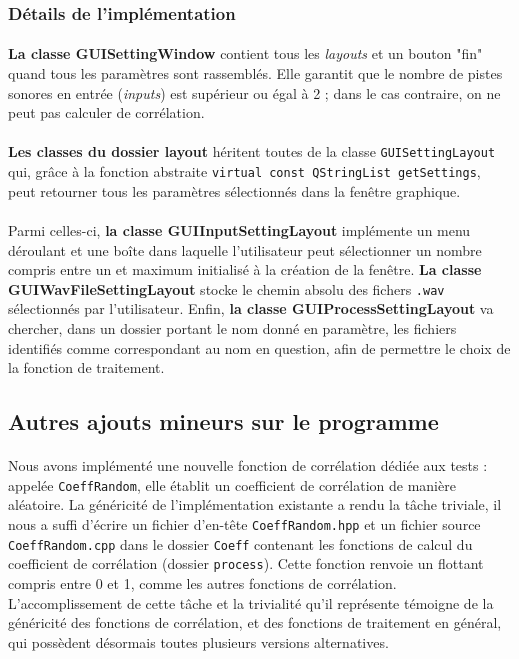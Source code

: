  \subsubsection{Détails de l'implémentation}
 \paragraph{}
 \textbf{La classe GUISettingWindow} contient tous les
 \textit{layouts} et un bouton "fin" quand tous les paramètres sont
 rassemblés. Elle garantit que le nombre de pistes sonores en entrée
 (\textit{inputs}) est supérieur ou égal à 2 ; dans le cas contraire,
 on ne peut pas calculer de corrélation.
 \paragraph{}
 \textbf{Les classes du dossier layout} héritent toutes de la classe
 \verb!GUISettingLayout! qui, grâce à la fonction abstraite
 \verb!virtual const QStringList getSettings!, peut retourner tous les
 paramètres sélectionnés dans la fenêtre graphique.
 \paragraph{}
 Parmi celles-ci, \textbf{la classe GUIInputSettingLayout} implémente
 un menu déroulant et une boîte dans laquelle l'utilisateur peut
 sélectionner un nombre compris entre un et maximum initialisé à la
 création de la fenêtre. \textbf{La classe GUIWavFileSettingLayout}
 stocke le chemin absolu des fichers \verb!.wav! sélectionnés par
 l'utilisateur. Enfin, \textbf{la classe GUIProcessSettingLayout} va
 chercher, dans un dossier portant le nom donné en paramètre, les
 fichiers identifiés comme correspondant au nom en question, afin de
 permettre le choix de la fonction de traitement.


 \subsection{Autres ajouts mineurs sur le programme}
 \paragraph{}
 Nous avons implémenté une nouvelle fonction de corrélation dédiée aux
 tests : appelée \verb!CoeffRandom!, elle établit un coefficient de
 corrélation de manière aléatoire. La généricité de l'implémentation
 existante a rendu la tâche triviale, il nous a suffi d'écrire un
 fichier d'en-tête \verb!CoeffRandom.hpp! et un fichier source
 \verb!CoeffRandom.cpp! dans le dossier \verb!Coeff! contenant les
 fonctions de calcul du coefficient de corrélation (dossier
 \verb!process!). Cette fonction renvoie un flottant compris entre 0 et
 1, comme les autres fonctions de corrélation. L'accomplissement de
 cette tâche et la trivialité qu'il représente témoigne de la
 généricité des fonctions de corrélation, et des fonctions de
 traitement en général, qui possèdent désormais toutes plusieurs
 versions alternatives.
